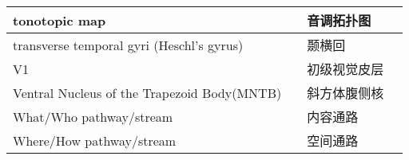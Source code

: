 \begin{table}[htbp]
{\begin{tabular}{llll}
		\midrule
		tonotopic map   && 音调拓扑图  \\
		
		\midrule
		transverse temporal gyri (Heschl's gyrus)   && 颞横回  \\
		
		\midrule
		V1   && 初级视觉皮层  \\
		
		\midrule
		Ventral Nucleus of the Trapezoid Body(MNTB)   && 斜方体腹侧核  \\
		
		\midrule
		What/Who pathway/stream  && 内容通路  \\
		
		\midrule
		Where/How pathway/stream && 空间通路  \\
		
		
		\bottomrule  

	\end{tabular}}
\end{table}%


